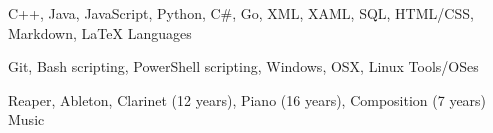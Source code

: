\documentclass[]{awesome-cv}
\begin{document}


\vspace{-2mm}
	\cventry
	{C++, Java, JavaScript, Python, C\#, Go, XML, XAML, SQL, HTML/CSS, Markdown, LaTeX}
	{Languages}
	{}
	{}
	{}

	\vspace{-8mm}
	\cventry
	{Git, Bash scripting, PowerShell scripting, Windows, OSX, Linux}
	{Tools/OSes}
	{}
	{}
	{}
	
	\vspace{-8mm}
	\cventry
	{Reaper, Ableton, Clarinet (12 years), Piano (16 years), Composition (7 years)}
	{Music}
	{}
	{}
	{}
	\vspace{-4mm}
\end{document}
